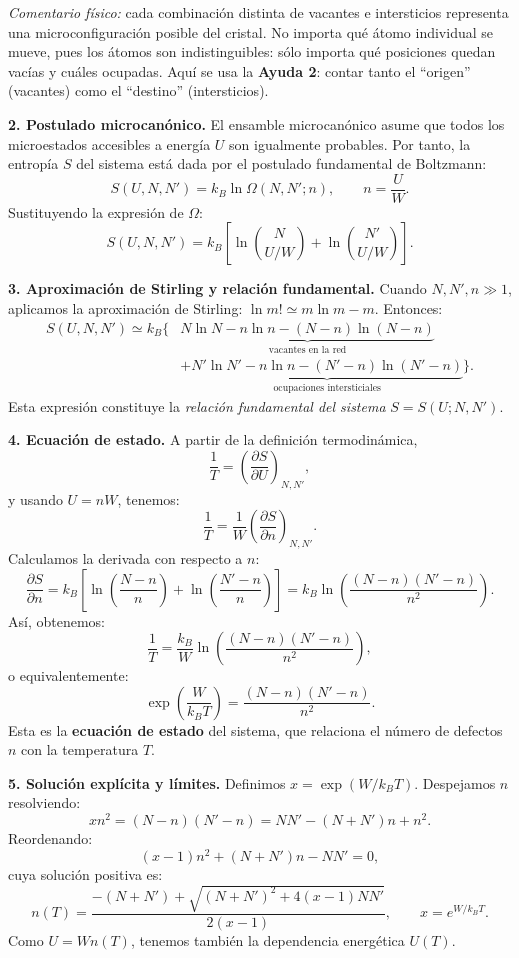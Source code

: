 \documentclass{article}
\begin{document}
\begin{enumerate}[label={{\textcolor{trueblue}{\textbf{Ej}. \arabic*.0}}}, start=2]
\textit{Comentario físico:} cada combinación distinta de vacantes e intersticios representa una microconfiguración posible del cristal.  
No importa qué átomo individual se mueve, pues los átomos son indistinguibles: sólo importa qué posiciones quedan vacías y cuáles ocupadas.  
Aquí se usa la \textbf{Ayuda 2}: contar tanto el “origen” (vacantes) como el “destino” (intersticios).

\vspace{1em}
\textbf{2. Postulado microcanónico.}  
El ensamble microcanónico asume que todos los microestados accesibles a energía \(U\) son igualmente probables.  
Por tanto, la entropía \(S\) del sistema está dada por el postulado fundamental de Boltzmann:
\[
S(U,N,N') = k_B \ln \Omega(N,N'; n),
\qquad n=\frac{U}{W}.
\]
Sustituyendo la expresión de \(\Omega\):
\[
S(U,N,N') = k_B\!\left[\ln \binom{N}{U/W} + \ln \binom{N'}{U/W}\right].
\]

\vspace{1em}
\textbf{3. Aproximación de Stirling y relación fundamental.}  
Cuando \(N, N', n\gg 1\), aplicamos la aproximación de Stirling:
\(\ln m! \simeq m\ln m - m\).  
Entonces:
\[
\begin{split}
S(U,N,N') \simeq k_B\Big\{&
\underbrace{N\ln N - n\ln n - (N-n)\ln(N-n)}_{\text{vacantes en la red}} \\
&+\underbrace{N'\ln N' - n\ln n - (N'-n)\ln(N'-n)}_{\text{ocupaciones intersticiales}}
\Big\}.
\end{split}
\]
Esta expresión constituye la \emph{relación fundamental del sistema} \(S=S(U;N,N')\).

\vspace{1em}
\textbf{4. Ecuación de estado.}  
A partir de la definición termodinámica,
\[
\frac{1}{T} = \left(\frac{\partial S}{\partial U}\right)_{N,N'},
\]
y usando \(U = nW\), tenemos:
\[
\frac{1}{T} = \frac{1}{W}\left(\frac{\partial S}{\partial n}\right)_{N,N'}.
\]
Calculamos la derivada con respecto a \(n\):
\[
\frac{\partial S}{\partial n} = k_B\!\left[
\ln\!\left(\frac{N-n}{n}\right) + \ln\!\left(\frac{N'-n}{n}\right)
\right]
= k_B\ln\!\left(\frac{(N-n)(N'-n)}{n^2}\right).
\]
Así, obtenemos:
\[
\frac{1}{T} = \frac{k_B}{W}\ln\!\left(\frac{(N-n)(N'-n)}{n^2}\right),
\]
o equivalentemente:
\[
\exp\!\left(\frac{W}{k_B T}\right)
= \frac{(N-n)(N'-n)}{n^2}.
\]
Esta es la \textbf{ecuación de estado} del sistema, que relaciona el número de defectos \(n\) con la temperatura \(T\).

\vspace{1em}
\textbf{5. Solución explícita y límites.}  
Definimos \(x = \exp(W/k_B T)\).  
Despejamos \(n\) resolviendo:
\[
x n^2 = (N-n)(N'-n) = NN' - (N+N')n + n^2.
\]
Reordenando:
\[
(x-1)n^2 + (N+N')n - NN' = 0,
\]
cuya solución positiva es:
\[
n(T)=\frac{-(N+N')+\sqrt{(N+N')^2+4(x-1)NN'}}{2(x-1)}, \qquad x=e^{W/k_BT}.
\]
Como \(U = Wn(T)\), tenemos también la dependencia energética \(U(T)\).


\end{enumerate}
\end{document}
